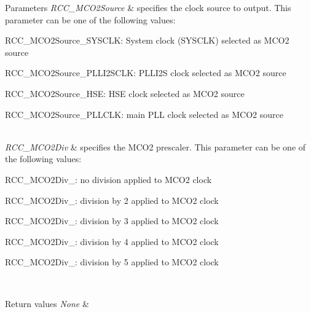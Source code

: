 \begin{DoxyParams}{Parameters}
{\em R\+C\+C\+\_\+\+M\+C\+O2\+Source} & specifies the clock source to output. This parameter can be one of the following values\+: \begin{DoxyItemize}
\item R\+C\+C\+\_\+\+M\+C\+O2\+Source\+\_\+\+S\+Y\+S\+C\+LK\+: System clock (S\+Y\+S\+C\+LK) selected as M\+C\+O2 source \item R\+C\+C\+\_\+\+M\+C\+O2\+Source\+\_\+\+P\+L\+L\+I2\+S\+C\+LK\+: P\+L\+L\+I2S clock selected as M\+C\+O2 source \item R\+C\+C\+\_\+\+M\+C\+O2\+Source\+\_\+\+H\+SE\+: H\+SE clock selected as M\+C\+O2 source \item R\+C\+C\+\_\+\+M\+C\+O2\+Source\+\_\+\+P\+L\+L\+C\+LK\+: main P\+LL clock selected as M\+C\+O2 source \end{DoxyItemize}
\\
\hline
{\em R\+C\+C\+\_\+\+M\+C\+O2\+Div} & specifies the M\+C\+O2 prescaler. This parameter can be one of the following values\+: \begin{DoxyItemize}
\item R\+C\+C\+\_\+\+M\+C\+O2\+Div\+\_\+: no division applied to M\+C\+O2 clock \item R\+C\+C\+\_\+\+M\+C\+O2\+Div\+\_\+: division by 2 applied to M\+C\+O2 clock \item R\+C\+C\+\_\+\+M\+C\+O2\+Div\+\_\+: division by 3 applied to M\+C\+O2 clock \item R\+C\+C\+\_\+\+M\+C\+O2\+Div\+\_\+: division by 4 applied to M\+C\+O2 clock \item R\+C\+C\+\_\+\+M\+C\+O2\+Div\+\_\+: division by 5 applied to M\+C\+O2 clock \end{DoxyItemize}
\\
\hline
\end{DoxyParams}

\begin{DoxyRetVals}{Return values}
{\em None} & \\
\hline
\end{DoxyRetVals}

